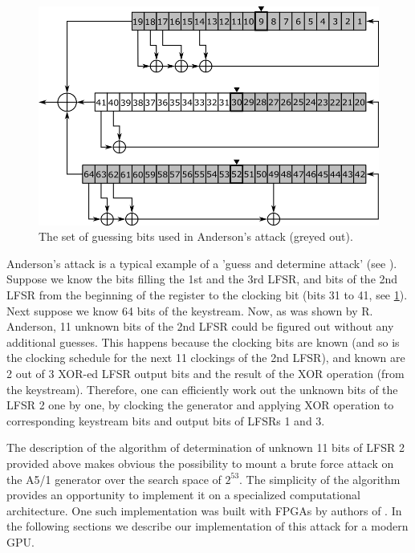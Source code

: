 \documentclass[runningheads,a4paper]{llncs}[2015/06/24]
\begin{document}
\begin{figure}
	\includegraphics[width=\linewidth]{./a51and.png} 
	\caption{The set of guessing bits used in Anderson's attack (greyed out).}
	\label{fig:a51and}
\end{figure}


Anderson's attack is a typical example of a 'guess and determine attack' (see
\cite{BARD}). Suppose we know the bits filling the 1st and the 3rd LFSR, and
bits of the 2nd LFSR from the beginning of the register to the clocking bit
(bits 31 to 41, see \cref{fig:a51and}). Next suppose we know 64 bits of the
keystream. Now, as was shown by R. Anderson, 11 unknown bits of the 2nd LFSR
could be figured out without any additional guesses. This happens because the
clocking bits are known (and so is the clocking schedule for the next 11
clockings of the 2nd LFSR), and known are 2 out of 3 XOR-ed LFSR output bits
and the result of the XOR operation (from the keystream). Therefore, one can
efficiently work out the unknown bits of the LFSR 2 one by one, by clocking the
generator and applying XOR operation to corresponding keystream bits and output
bits of LFSRs 1 and 3.

The description of the algorithm of determination of unknown 11 bits of LFSR 2
provided above makes obvious the possibility to mount a brute force attack on
the A5/1 generator over the search space of $2^{53}$. The simplicity of the
algorithm provides an opportunity to implement it on a specialized
computational architecture. One such implementation was built with FPGAs by
authors of \cite{COPAC_1}. In the following sections we describe our
implementation of this attack for a modern GPU.


\end{document}
